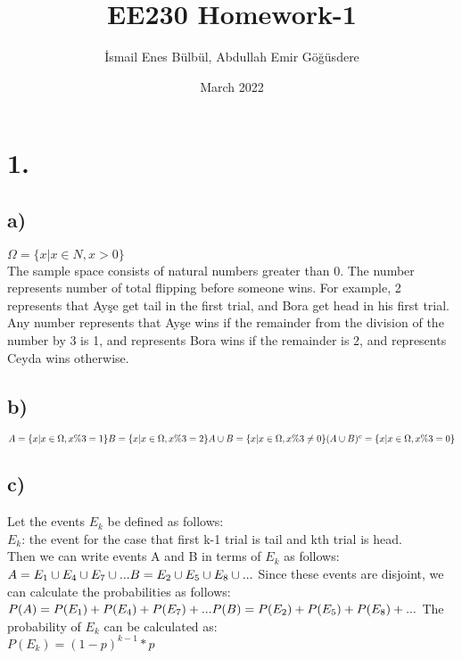 \documentclass{article}
\title{EE230 Homework-1}
\author{İsmail Enes Bülbül, Abdullah Emir Göğüsdere}
\date{March 2022}
\begin{document}
\maketitle
    \section*{1.}
    \subsection*{a)}
    \begin{math}
        \Omega = \{ x | x \in N, x > 0 \} 
    \end{math}
    \\
    The sample space consists of natural numbers greater than 0.
    The number represents number of total flipping before someone wins.
    For example, 2 represents that Ayşe get tail in the first trial,
    and Bora get head in his first trial.
    Any number represents that Ayşe wins if the remainder from the
    division of the number by 3 is 1, and represents Bora wins if
    the remainder is 2, and represents Ceyda wins otherwise.
    \subsection*{b)}
    \begin{math}
        A = \{ x | x \in \Omega, x  \% 3 = 1 \} \\
        B = \{ x | x \in \Omega, x  \% 3 = 2 \} \\
        A\cup B = \{ x | x \in \Omega, x  \% 3 \neq 0 \} \\
        (A\cup B)^c = \{ x | x \in \Omega, x  \% 3 = 0 \} \\
    \end{math}
    \subsection*{c)}
    Let the events \(E_k\) be defined as follows:\\
    \(E_k\): the event for the case that first k-1 trial is tail and kth trial is head.\\
    Then we can write events A and B in terms of \(E_k\) as follows:\\
    \begin{math}
        A = E_1 \cup E_4 \cup E_7 \cup ...\\
        B = E_2 \cup E_5 \cup E_8 \cup ...\\
    \end{math}
    Since these events are disjoint, we can calculate the probabilities as follows:
    \begin{math}
        P(A) = P(E_1) + P(E_4) + P(E_7) + ...\\
        P(B) = P(E_2) + P(E_5) + P(E_8) + ...\\
    \end{math}
    The probability of \(E_k\) can be calculated as:\\
    \begin{math}
        P(E_k) = (1-p)^{k-1}*p
    \end{math}
    
\end{document}
